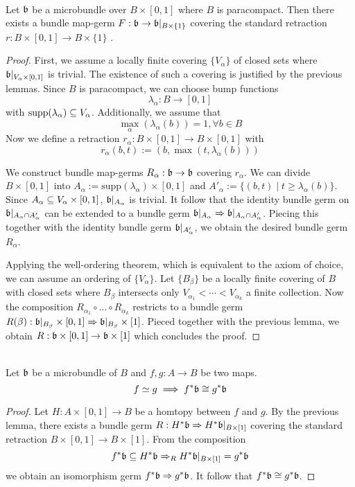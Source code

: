 \begin{file}
\newcommand{\A}[1][] {
    A_\alpha#1
}


\lemma{()} \\
Let $\mathfrak{b}$ be a microbundle over $B \times [0, 1]$ where $B$ is paracompact.
Then there exists a bundle map-germ $F: \mathfrak{b} \to \mathfrak{b}\vert_{B \times \{1\}}$
covering the standard retraction $r: B \times [0, 1] \to B \times \{1\}$ .
\begin{proof}
First, we assume a locally finite covering $\{V_\alpha\}$ of closed sets where $\mathfrak{b}\vert_{V_\alpha \times [0, 1]}$ is trivial.
The existence of such a covering is justified by the previous lemmas.
Since $B$ is paracompact, we can choose bump functions 
\[ \lambda_\alpha: B \to [0, 1] \]
with $\text{supp}(\lambda_\alpha) \subseteq V_\alpha$.
Additionally, we assume that 
\[ \max_{\alpha}(\lambda_\alpha(b)) = 1, \forall b \in B \]
Now we define a retraction $r_\alpha: B \times [0, 1] \to B \times [0, 1]$ with
\[ r_\alpha(b, t) := (b, \max(t, \lambda_\alpha(b))) \]

We construct bundle map-germs $R_\alpha: \mathfrak{b} \to \mathfrak{b}$ covering $r_\alpha$.
We can divide $B \times [0, 1]$ into $A_\alpha := \text{supp}(\lambda_\alpha) \times [0, 1]$ and $A'_\alpha := \{(b, t) \mid t \ge \lambda_\alpha(b)\}$.
Since $A_\alpha \subseteq V_\alpha \times [0, 1]$, $\mathfrak{b}\vert_{A_\alpha}$ is trivial.
It follow that the identity bundle germ on $\bb\restrict{\A \cap \A[']}$ can be extended to a bundle germ $\bb\restrict{\A} \double \bb\restrict{\A \cap \A[']}$.
Piecing this together with the identity bundle germ $\bb\restrict{\A[']}$, we obtain the desired bundle germ $R_\alpha$.

Applying the well-ordering theorem, which is equivalent to the axiom of choice, we can assume an ordering of $\{ V_\alpha \}$.
Let $\{B_\beta\}$ be a locally finite covering of $B$ with closed sets where $B_\beta$ intersects only $V_{\alpha_1} < \cdots < V_{\alpha_k}$ a finite collection.
Now the composition $R_{\alpha_1} \circ \ldots \circ R_{\alpha_k}$ restricts to a bundle germ $R(\beta): \mathfrak{b}\vert_{B_\beta} \times [0, 1] \Rightarrow \mathfrak{b}\vert_{B_\beta} \times [1]$.
Pieced together with the previous lemma, we obtain $R: \mathfrak{b} \times [0, 1]\to \mathfrak{b} \times [1]$ which concludes the proof.
\end{proof}

 \\
Let $\mathfrak{b}$ be a microbundle of $B$ and $f, g: A \to B$ be two maps.
\[ f \simeq g \implies f^*\mathfrak{b} \cong g^*\mathfrak{b} \]
\begin{proof}
Let $H: A \times [0, 1] \to B$ be a homtopy between $f$ and $g$.
By the previous lemma, there exists a bundle germ $R: H^*\mathfrak{b} \Rightarrow H^*\mathfrak{b}\vert_{B \times [1]}$ covering the standard retraction $B \times [0, 1] \to B \times [1]$.
From the composition
\[ f^*\mathfrak{b} \subseteq H^*\mathfrak{b} \Rightarrow_R H^*\mathfrak{b}\vert_{B \times [1]} = g^*\mathfrak{b} \]
we obtain an isomorphism germ $f^*\mathfrak{b} \Rightarrow g^*\mathfrak{b}$.
It follow that $f^*\mathfrak{b} \cong g^*\mathfrak{b}$.
\end{proof}

\end{file}